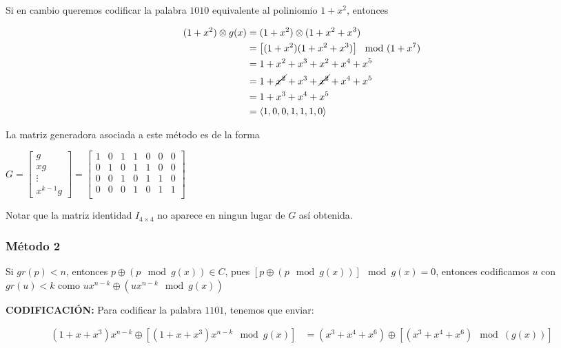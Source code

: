 \documentclass[10pt,a4paper]{article}
\begin{document}
Si en cambio queremos codificar la palabra $1010$ equivalente al poliniomio $1+ x^2$, entonces

\begin{center}
\begin{align*} (1+x^2)\otimes g(x) &=(1+x^2)\otimes (1+x^2+x^3)\\ &= \left[(1+x^2) (1+x^2+x^3)\right]\mod(1 + x^7)\\ &= 1+x^2 + x^3+ x^2+x^4+x^5\\ &= 1+\cancel{x^2} + x^3+ \cancel{x^2}+x^4+x^5\\ &= 1 + x^3 + x^4 + x^5\\ &= \langle 1, 0,0,1,1,1,0\rangle \end{align*}
\end{center}

La matriz generadora asociada a este método es de la forma

\begin{center}
$G= \left[ \begin{array}{c} g\\ x g\\ \vdots\\ x^{k-1}g \end{array} \right] = \left[ \begin{array}{ccccccc} 1&0&1&1&0&0&0\\ 0&1&0&1&1&0&0\\ 0&0&1&0&1&1&0\\ 0&0&0&1&0&1&1\\ \end{array} \right]$
\end{center}

Notar que la matriz identidad $I_{4 \times 4}$ no aparece en ningun lugar de $G$ así obtenida.

\subsubsection*{Método 2}

Si $gr(p) < n$, entonces $p \oplus (p \mod g(x)) \in C$, pues $\left[p\oplus (p\mod g(x))\right]\mod g(x) = 0$, entonces codificamos $u$ con $gr(u) < k$ como $u x^{n-k} \oplus (ux^{n-k} \mod g(x))$

\textbf{CODIFICACIÓN:} Para codificar la palabra $1101$, tenemos que enviar:

\begin{center}
\begin{align*} (1+x+x^3)x^{n-k}\oplus\left[(1+x+x^3)x^{n-k} \mod g(x)\right] &=(x^3+x^4+x^6)\oplus\left[(x^3+x^4+x^6) \mod (g(x)) \right]\\ \end{align*}
\end{center}
\end{document}
